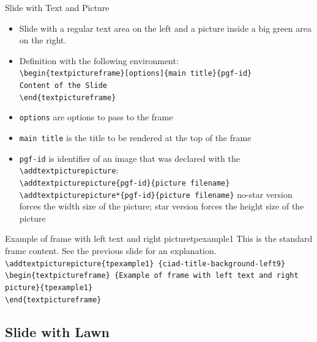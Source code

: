 \documentclass[english,sectioncirclenumberstyle]{ciadbeamer}
\begin{document}
\begin{frame}{Slide with Text and Picture}
	\begin{itemize}
		\item Slide with a regular text area on the left and a picture inside a big green area on the right.
		\item Definition with the following environment: \\
		\texttt{{\textbackslash}begin\{textpictureframe\}[options]\{main title\}\{pgf-id\}} \\
		\texttt{Content of the Slide} \\
		\texttt{{\textbackslash}end\{textpictureframe\}}
		\item \texttt{options} are options to pass to the frame
		\item \texttt{main title} is the title to be rendered at the top of the frame
		\item \texttt{pgf-id} is identifier of an image that was declared with the \texttt{{\textbackslash}addtextpicturepicture}: \\
		\texttt{{\textbackslash}addtextpicturepicture\{pgf-id\}\{picture filename\}} \\
		\texttt{{\textbackslash}addtextpicturepicture*\{pgf-id\}\{picture filename\}}
		no-star version forces the width size of the picture; star version forces the height size of the picture
	\end{itemize}
\end{frame}

\begin{textpictureframe}{{Example of frame} with left text and right picture}{tpexample1}
	This is the standard frame content. See the previous slide for an explanation. \\[.5cm]
	\smaller
	\texttt{{\textbackslash}addtextpicturepicture\{tpexample1\} \{ciad-title-background-left9\}} \\
	\texttt{{\textbackslash}begin\{textpictureframe\} \{Example of frame with left text and right picture\}\{tpexample1\}} \\
	\texttt{{\textbackslash}end\{textpictureframe\}}
\end{textpictureframe}

\subsection{Slide with Lawn}
\end{document}
